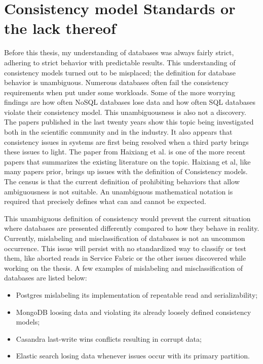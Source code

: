 \documentclass[a4paper,10pt,titlepage]{report}
\begin{document}
\section{Consistency model Standards or the lack thereof}

Before this thesis, my understanding of databases was always fairly strict, adhering to strict behavior with predictable results. This understanding of consistency models turned out to be misplaced; the definition for database behavior is unambiguous. Numerous databases often fail the consistency requirements when put under some workloads. Some of the more worrying findings are how often NoSQL databases lose data and how often SQL databases violate their consistency model. This unambiguousness is also not a discovery. The papers published in the last twenty years show this topic being investigated both in the scientific community and in the industry. It also appears that consistency issues in systems are first being resolved when a third party brings these issues to light. The paper from Haixiang et al. \cite{li2021coo} is one of the more recent papers that summarizes the existing literature on the topic. Haixiang et al, like many papers prior, brings up issues with the definition of Consistency models. The census is that the current definition of prohibiting behaviors that allow ambiguousness is not suitable. An unambiguous mathematical notation is required that precisely defines what can and cannot be expected.

\vspace{5mm}
This unambiguous definition of consistency would prevent the current situation where databases are presented differently compared to how they behave in reality. Currently, mislabeling and misclassification of databases is not an uncommon occurrence. This issue will persist with no standardized way to classify or test them, like aborted reads in Service Fabric or the other issues discovered while working on the thesis. A few examples of  mislabeling and misclassification of databases are listed below: \\\vspace{5mm}
\begin{itemize}
    \item Postgres mislabeling its implementation of repeatable read and serializability;
    \item MongoDB loosing data and violating its already loosely defined consistency models;
    \item Casandra last-write wins conflicts resulting in corrupt data;
    \item Elastic search losing data whenever issues occur with its primary partition.
\end{itemize}
\end{document}
